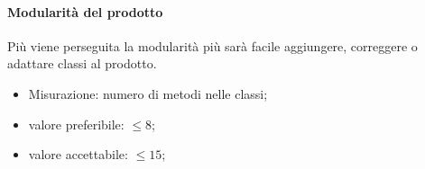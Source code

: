             \paragraph{Modularità del prodotto}
                Più viene perseguita la modularità più sarà facile aggiungere, correggere o adattare classi al prodotto\glo.
                \begin{itemize}
                    \item Misurazione: numero di metodi nelle classi;
                    \item valore preferibile: $\leq 8$;
                    \item valore accettabile: $\leq 15$;
                \end{itemize}
